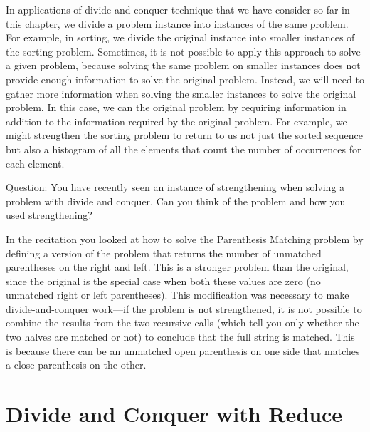 \begin{gram}[Strengthening]
In applications of divide-and-conquer technique that we have consider so far in this chapter, we divide a problem instance into instances of the same problem.
%
For example, in sorting, we divide the original instance into  smaller instances of the sorting problem.
%
Sometimes, it is not possible to apply this approach to solve a given problem, because solving the same problem on smaller instances does not provide enough information to solve the original problem.
%
Instead, we will need to gather more information
when solving the smaller instances to solve the original problem. 
%
In this case, we can  the original problem by requiring information in addition to the information required by the original problem.
%
For example, we might strengthen the sorting problem to return to us not just the sorted sequence but also a histogram of all the elements that count the number of occurrences for each element.
\end{gram}

\begin{teachnote}
Question:
You have recently seen an instance of strengthening when solving
a problem with divide and conquer. Can you think of the problem and
how you used strengthening?

In the recitation you looked at how to solve the Parenthesis Matching
problem by defining a version of the problem that returns the number
of unmatched parentheses on the right and left.  This is a stronger
problem than the original, since the original is the special case when
both these values are zero (no unmatched right or left parentheses).
This modification was necessary to make divide-and-conquer work---if
the problem is not strengthened, it is not possible to combine the
results from the two recursive calls (which tell you only whether the
two halves are matched or not) to conclude that the full string is
matched.  This is because there can be an unmatched open parenthesis
on one side that matches a close parenthesis on the other.
\end{teachnote}

\section{Divide and Conquer with Reduce}
\label{sec:design::dc::with-reduce}

